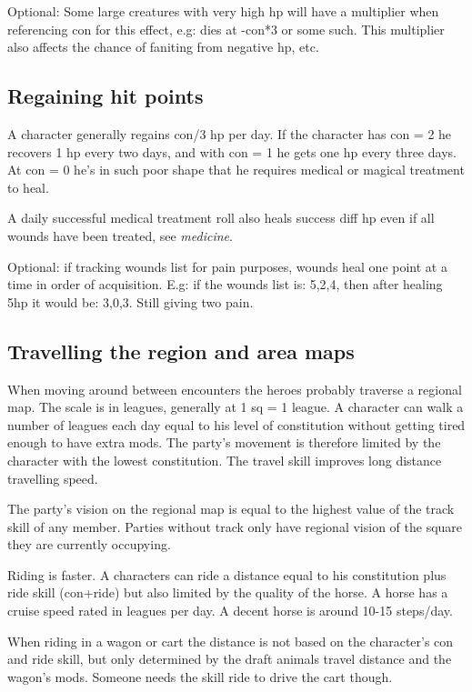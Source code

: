 Optional: Some large creatures with very high hp will have a multiplier when referencing con for this effect, e.g: dies at -con*3 or some such. This multiplier also affects the chance of faniting from negative hp, etc.


\subsection*{Regaining hit points}
A character generally regains con/3 hp per day. If the character has con = 2 he recovers 1 hp every two days, and with con = 1 he gets one hp every three days. At con = 0 he's in such poor shape that he requires medical or magical treatment to heal.

A daily successful medical treatment roll also heals success diff hp even if all wounds have been treated, see \emph{medicine}.

Optional: if tracking wounds list for pain purposes, wounds heal one point at a time in order of acquisition. E.g: if the wounds list is: 5,2,4, then after healing 5hp it would be: 3,0,3. Still giving two pain.


\subsection*{Travelling the region and area maps}
When moving around between encounters the heroes probably traverse a regional map. The scale is in leagues, generally at 1 sq = 1 league. A character can walk a number of leagues each day equal to his level of constitution without getting tired enough to have extra mods. The party's movement is therefore limited by the character with the lowest constitution. The travel skill improves long distance travelling speed.

The party's vision on the regional map is equal to the highest value of the track skill of any member. Parties without track only have regional vision of the square they are currently occupying.

Riding is faster. A characters can ride a distance equal to his constitution plus ride skill (con+ride) but also limited by the quality of the horse. A horse has a cruise speed rated in leagues per day. A decent horse is around 10-15 steps/day.

When riding in a wagon or cart the distance is not based on the character's con and ride skill, but only determined by the draft animals travel distance and the wagon's mods. Someone needs the skill ride to drive the cart though.


